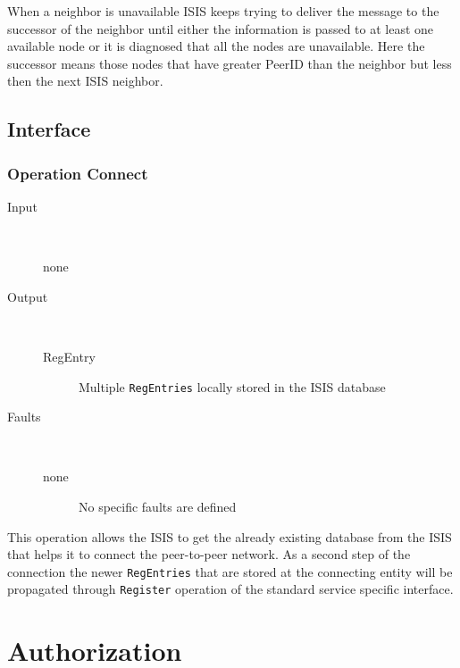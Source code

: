 \documentclass{book}
\begin{document}
When a neighbor is unavailable ISIS keeps trying to deliver the message to the successor of the neighbor until either the information is passed to at least one available node or it is diagnosed that all the nodes are unavailable. Here the successor means those nodes that have greater PeerID than the neighbor but less then the next ISIS neighbor.

\subsection{Interface}
\label{sub:isis_peer_to_peer_interface}
\subsubsection{Operation Connect}

\begin{description}

  \item[Input]~\begin{description}
    \item[none]
  \end{description}

  \item[Output]~\begin{description}
    \item[RegEntry] Multiple \texttt{RegEntries} locally stored in the ISIS database
  \end{description}

  \item[Faults]~\begin{description}
    \item[none]No specific faults are defined
  \end{description}

\end{description}

This operation allows the ISIS to get the already existing database from the ISIS that helps it to connect the peer-to-peer network. As a second step of the connection the newer  \texttt{RegEntries} that are stored at the connecting entity will be propagated through \texttt{Register} operation of the standard service specific interface.



\section{Authorization}
\label{sec:isis_authorization}
\end{document}

